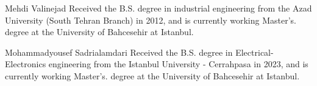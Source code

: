 \documentclass[journal]{IEEEtran}
\begin{document}



%




% 


\begin{IEEEbiographynophoto}{Mehdi Valinejad}
Received the B.S. degree in industrial engineering from the Azad University (South Tehran Branch) in 2012, and is currently working Master's. degree at the University of Bahcesehir at Istanbul.
\end{IEEEbiographynophoto}

\begin{IEEEbiographynophoto}{Mohammadyousef Sadrialamdari}
Received the B.S. degree in Electrical-Electronics engineering from the  Istanbul University - Cerrahpasa in 2023, and is currently working Master’s. degree at the University of Bahcesehir at Istanbul.
\end{IEEEbiographynophoto}
\end{document}

